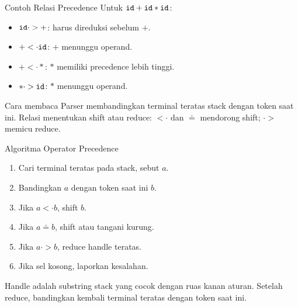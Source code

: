 \documentclass[aspectratio=169,10pt,t]{beamer}
\begin{document}
\begin{frame}{Contoh Relasi Precedence}
  \small
  Untuk \(\texttt{id}+\texttt{id}*\texttt{id}\):
  \begin{itemize}
    \item \(\texttt{id} \cdot> +\):  harus direduksi sebelum
          \(+\).
    \item \(+ <\cdot \texttt{id}\): \(+\) menunggu operand.
    \item \(+ <\cdot *\): \(*\) memiliki precedence lebih tinggi.
    \item \(* \cdot> \texttt{id}\): \(*\) menunggu operand.
  \end{itemize}

  \vspace{4pt}
  \begin{block}{Cara membaca}
    \footnotesize
    Parser membandingkan terminal teratas stack dengan token saat ini.
    Relasi menentukan shift atau reduce: \(<\cdot\) dan \(\doteq\)
    mendorong shift; \(\cdot>\) memicu reduce.
  \end{block}
\end{frame}

\begin{frame}{Algoritma Operator Precedence}
  \begin{enumerate}
    \setlength{\itemsep}{2pt}
    \item Cari terminal teratas pada stack, sebut \(a\).
    \item Bandingkan \(a\) dengan token saat ini \(b\).
    \item Jika \(a <\cdot b\), shift \(b\).
    \item Jika \(a \doteq b\), shift atau tangani kurung.
    \item Jika \(a \cdot> b\), reduce handle teratas.
    \item Jika sel kosong, laporkan kesalahan.
  \end{enumerate}

  \vspace{4pt}
  {\footnotesize Handle adalah substring stack yang cocok dengan ruas
  kanan aturan. Setelah reduce, bandingkan kembali terminal teratas
  dengan token saat ini.}
\end{frame}
\end{document}
